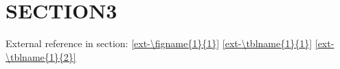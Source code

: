 \documentclass[../main/main]{subfiles}
\begin{document}
\section{SECTION3}
\lipsum[5-7]

\cite{smit54,colu92,gree00,phil99,jame76}

External reference in section:
\ref{ext-\figname{1}{1}}
\ref{ext-\tblname{1}{1}}
\ref{ext-\tblname{1}{2}}

\end{document}
